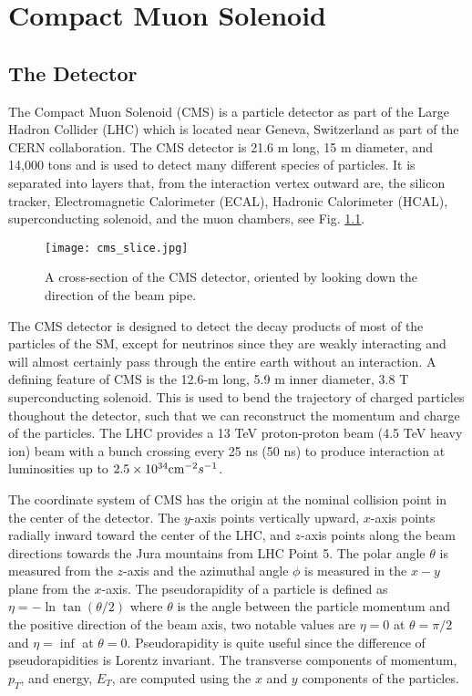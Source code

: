 \chapter{Compact Muon Solenoid}
\label{ch:CMS}

\section{The Detector}
\label{sec:cmsIntro}

The Compact Muon Solenoid (CMS) is a particle detector as part of the Large Hadron Collider (LHC) which is located near Geneva, Switzerland as part of the CERN collaboration. The CMS detector is 21.6 m long, 15 m diameter, and 14,000 tons and is used to detect many different species of particles. It is separated into layers that, from the interaction vertex outward are, the silicon tracker, Electromagnetic Calorimeter (ECAL), Hadronic Calorimeter (HCAL), superconducting solenoid, and the muon chambers, see Fig. \ref{CMSSlice}. 

\begin{figure}
 	\centering
	\texttt{[image: cms\_slice.jpg]}
 	\caption{A cross-section of the CMS detector, oriented by looking down the direction of the beam pipe. }
 	\label{CMSSlice} 
\end{figure}

The CMS detector is designed to detect the decay products of most of the particles of the SM, except for neutrinos since they are weakly interacting and will almost certainly pass through the entire earth without an interaction. A defining feature of CMS is the 12.6-m long, 5.9 m inner diameter, 3.8 T superconducting solenoid. This is used to bend the trajectory of charged particles thoughout the detector, such that we can reconstruct the momentum and charge of the particles. The LHC provides a 13 TeV proton-proton beam (4.5 TeV heavy ion) beam with a bunch crossing every 25 ns (50 ns) to produce interaction at luminosities up to $2.5\times10^{34} \text{cm}^{-2}s^{-1}$. 

The coordinate system of CMS has the origin at the nominal collision point in the center of the detector. The $y$-axis points vertically upward, $x$-axis points radially inward toward the center of the LHC, and $z$-axis points along the beam directions towards the Jura mountains from LHC Point 5. The polar angle $\theta$ is measured from the $z$-axis and the azimuthal angle $\phi$ is measured in the $x-y$ plane from the $x$-axis. The pseudorapidity of a particle is defined as $\eta=-\ln\tan(\theta/2)$ where $\theta$ is the angle between the particle momentum and the positive direction of the beam axis, two notable values are $\eta=0$ at $\theta=\pi/2$ and $\eta=\inf$ at $\theta=0$. Pseudorapidity is quite useful since the difference of pseudorapidities is Lorentz invariant. The transverse components of momentum, $p_T$, and energy, $E_T$, are computed using the $x$ and $y$ components of the particles. 


